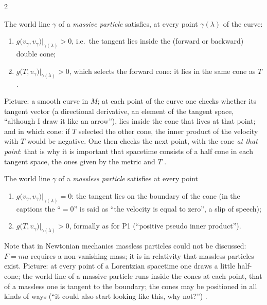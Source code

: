 \begin{paracol}{2}
\begin{definition}\label{def:c13-p1}
The world line $\gamma$ of a \emph{massive particle} satisfies, at every point $\gamma(\lambda)$ of the curve:
\begin{enumerate}
  \item $g\bigl(v_\gamma,v_\gamma\bigr)\big|_{\gamma(\lambda)}>0$, i.e.\ the tangent lies inside the (forward or backward) double cone;
  \item $g\bigl(T,v_\gamma\bigr)\big|_{\gamma(\lambda)}>0$, which selects the forward cone: it lies in the same cone as $T$.
\end{enumerate}
\end{definition}
Picture: a smooth curve in $M$; at each point of the curve one checks whether its tangent vector (a directional derivative, an element of the tangent space, ``although I draw it like an arrow''), lies inside the cone that lives at that point; and in which cone: if $T$ selected the other cone, the inner product of the velocity with $T$ would be negative. One then checks the next point, with the cone \emph{at that point}: that is why it is important that spacetime consists of a half cone in each tangent space, the ones given by the metric and $T$ .

\begin{definition}\label{def:c13-p2}
The world line $\gamma$ of a \emph{massless particle} satisfies at every point
\begin{enumerate}
  \item $g\bigl(v_\gamma,v_\gamma\bigr)\big|_{\gamma(\lambda)}=0$: the tangent lies on the boundary of the cone (in the captions the ``$=0$'' is said as ``the velocity is equal to zero'', a slip of speech);
  \item $g\bigl(T,v_\gamma\bigr)\big|_{\gamma(\lambda)}>0$, formally as for P1 (``positive pseudo inner product'').
\end{enumerate}
\end{definition}
Note that in Newtonian mechanics massless particles could not be discussed: $F=ma$ requires a non-vanishing mass; it is in relativity that massless particles exist. Picture: at every point of a Lorentzian spacetime one draws a little half-cone; the world line of a massive particle runs inside the cones at each point, that of a massless one is tangent to the boundary; the cones may be positioned in all kinds of ways (``it could also start looking like this, why not?'') .


\end{paracol}
